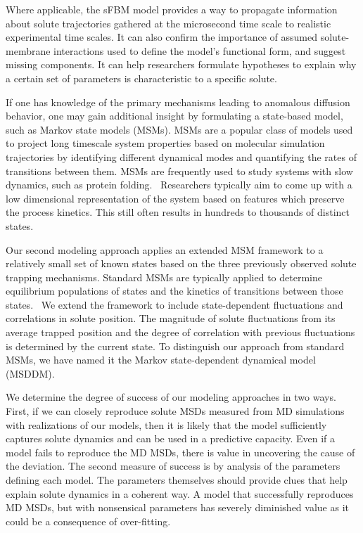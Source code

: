 \documentclass[aps,pre,preprint,groupedaddress,longbibliography]{revtex4-2}
\begin{document}
  Where applicable, the sFBM model provides a way to propagate information about
  solute trajectories gathered at the microsecond time scale to realistic experimental
  time scales. It can also confirm the importance of assumed solute-membrane interactions
  used to define the model's functional form, and suggest missing components. It
  can help researchers formulate hypotheses to explain why a certain set of parameters
  is characteristic to a specific solute.
  
  If one has knowledge of the primary mechanisms leading to anomalous diffusion behavior,
  one may gain additional insight by formulating a state-based model, such as Markov state
  models (MSMs). MSMs are a popular class of models used to project long timescale
  system properties based on molecular simulation trajectories by identifying
  different dynamical modes and quantifying the rates of transitions between them.
  MSMs are frequently used to study systems with slow dynamics, such as protein 
  folding.~\cite{snow_how_2005,chodera_automatic_2007} Researchers typically aim to 
  come up with a low dimensional representation of the system based on features 
  which preserve the process kinetics. This still often results in hundreds to thousands
  of distinct states.~\cite{chodera_markov_2014}

  Our second modeling approach applies an extended MSM framework to a relatively 
  small set of known states based on the three previously observed solute trapping mechanisms.  
  Standard MSMs are typically applied to determine equilibrium populations
  of states and the kinetics of transitions between those states.~\cite{bowman_using_2009} 
  We extend the framework to include state-dependent fluctuations and correlations in 
  solute position. The magnitude of solute fluctuations from its average trapped 
  position and the degree of correlation with previous fluctuations is 
  determined by the current state. To distinguish our approach from standard MSMs, we have
  named it the Markov state-dependent dynamical model (MSDDM).
  
  We determine the degree of success of our modeling approaches in two ways. First,
  if we can closely reproduce solute MSDs measured from MD simulations with realizations
  of our models, then it is likely that the model sufficiently captures solute 
  dynamics and can be used in a predictive capacity. Even if a model fails to 
  reproduce the MD MSDs, there is value in uncovering the cause of the deviation.
  The second measure of success is by analysis of the parameters defining each 
  model. The parameters themselves should provide clues that help explain solute 
  dynamics in a coherent way. A model that successfully reproduces MD MSDs, but 
  with nonsensical parameters has severely diminished value as it could be a 
  consequence of over-fitting.
  
\end{document}
